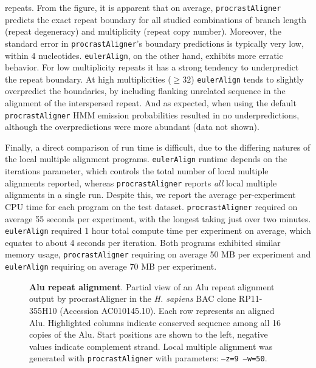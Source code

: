 \documentclass[10pt,journal,letterpaper,compsoc,peerreview]{IEEEtran}
\begin{document}
repeats. From the figure, it is apparent that on average, \texttt{procrastAligner} predicts
the exact repeat boundary for all studied combinations of branch length (repeat degeneracy)
and multiplicity (repeat copy number).  Moreover, the standard error in \texttt{procrastAligner}'s
boundary predictions is typically very low, within 4 nucleotides.  \texttt{eulerAlign}, on the other hand,
exhibits more erratic behavior.  For low multiplicity repeats it has a strong tendency to
underpredict the repeat boundary.  At high multiplicities ($\geq32$) \texttt{eulerAlign} tends to
slightly overpredict the boundaries, by including flanking unrelated sequence in the alignment of
the interspersed repeat.  And as expected, when using the default \texttt{procrastAligner} HMM emission probabilities resulted in no underpredictions, although the overpredictions were more abundant (data not shown).

Finally, a direct comparison of run time is difficult, due to the differing natures of the local multiple alignment programs.  \texttt{eulerAlign} runtime depends on the iterations parameter, which controls the total number of local multiple alignments reported, whereas \texttt{procrastAligner} reports \textit{all} local multiple alignments in a single run.  Despite this, we report the average per-experiment CPU time for each program on the test dataset. \texttt{procrastAligner} required on average 55 seconds per experiment, with the longest taking just over two minutes. \texttt{eulerAlign} required 1 hour total compute time per experiment on average, which equates to about 4 seconds per iteration.  Both programs exhibited similar memory usage, \texttt{procrastAligner} requiring on average 50 MB per experiment and \texttt{eulerAlign} requiring on average 70 MB per experiment.

\begin{figure*}[ht!]
\centering {}
\vspace{-1.0cm}
\caption[Alu repeat alignment]%
{\textbf{Alu repeat alignment}. Partial view of an Alu repeat alignment output by procrastAligner in the \emph{H. sapiens} BAC
clone RP11-355H10 (Accession AC010145.10). Each row represents an
aligned Alu. Highlighted columns indicate conserved sequence among all
16 copies of the Alu. Start positions are shown to the left, negative
values indicate complement strand.  Local multiple alignment was
generated with \texttt{procrastAligner} with parameters: \texttt{--z=9
--w=50}.  }
\label{fig-align}
\end{figure*}
\end{document}
